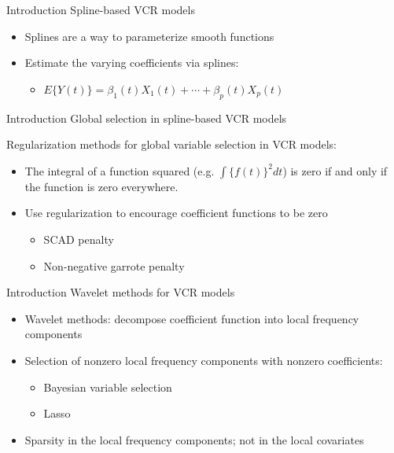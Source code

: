 \documentclass[12pt,t]{beamer}
\newcommand{\subt}[1]{{\footnotesize \color{subtitle} {#1}}}
\begin{document}
\begin{frame}{Introduction}
\subt{Spline-based VCR models \citep{Wood:2006}}

\bigskip
\begin{itemize}
    \item Splines are a way to parameterize smooth functions
    \item Estimate the varying coefficients via splines:
    \begin{itemize}
        \item $E\{Y(t)\} = \beta_1(t) X_1(t) + \cdots + \beta_p(t) X_p(t)$
    \end{itemize}
\end{itemize}

\end{frame}




\begin{frame}{Introduction}
\subt{Global selection in spline-based VCR models}

\bigskip
Regularization methods for global variable selection in VCR models:
\begin{itemize}
  \item The integral of a function squared (e.g. $\int \{f(t)\}^2 dt$) is zero if and only if the function is zero everywhere.
  \item Use regularization to encourage coefficient functions to be zero
  \begin{itemize}
    \item SCAD penalty \citep{Wang:2008a}
    \item Non-negative garrote penalty \citep{Antoniadis:2012b}
  \end{itemize}
\end{itemize}

\end{frame}




\begin{frame}{Introduction}
\subt{Wavelet methods for VCR models}

\bigskip
\begin{itemize}
  \item Wavelet methods: decompose coefficient function into local frequency components
  \item Selection of nonzero local frequency components with nonzero coefficients:
  \begin{itemize}
    \item Bayesian variable selection \citep{Shang-2011}
    \item Lasso \citep{Zhang-2011}
  \end{itemize} 
  \item Sparsity in the local frequency components; not in the local covariates
\end{itemize}

\end{frame}
\end{document}
